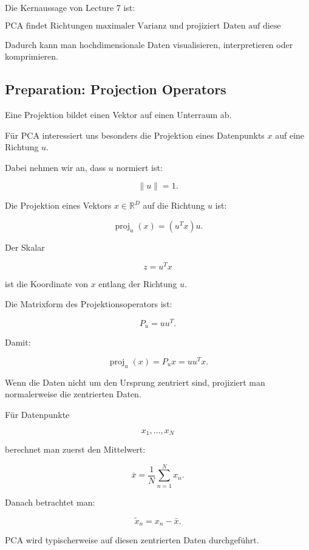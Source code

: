 \documentclass[11pt,a4paper]{scrartcl}
\begin{document}
\begin{answerbox}
    Die Kernaussage von Lecture 7 ist:

    \[
        \boxed{
            \text{PCA findet Richtungen maximaler Varianz und projiziert Daten auf diese Richtungen.}
        }
    \]

    Dadurch kann man hochdimensionale Daten visualisieren, interpretieren oder
    komprimieren.
\end{answerbox}

\subsection{Preparation: Projection Operators}

\begin{notebox}
    Eine Projektion bildet einen Vektor auf einen Unterraum ab.

    Für PCA interessiert uns besonders die Projektion eines Datenpunkts \(x\)
    auf eine Richtung \(u\).

    Dabei nehmen wir an, dass \(u\) normiert ist:

    \[
        \|u\| = 1.
    \]
\end{notebox}

\begin{calculationbox}
    Die Projektion eines Vektors \(x \in \mathbb{R}^D\) auf die Richtung \(u\)
    ist:

    \[
        \operatorname{proj}_u(x)
        =
        (u^T x)u.
    \]

    Der Skalar

    \[
        z = u^T x
    \]

    ist die Koordinate von \(x\) entlang der Richtung \(u\).

    Die Matrixform des Projektionsoperators ist:

    \[
        P_u
        =
        uu^T.
    \]

    Damit:

    \[
        \operatorname{proj}_u(x)
        =
        P_u x
        =
        uu^T x.
    \]
\end{calculationbox}

\begin{solutionbox}
    Wenn die Daten nicht um den Ursprung zentriert sind, projiziert man
    normalerweise die zentrierten Daten.

    Für Datenpunkte

    \[
        x_1,\dots,x_N
    \]

    berechnet man zuerst den Mittelwert:

    \[
        \bar x
        =
        \frac{1}{N}
        \sum_{n=1}^{N} x_n.
    \]

    Danach betrachtet man:

    \[
        \tilde x_n
        =
        x_n - \bar x.
    \]

    PCA wird typischerweise auf diesen zentrierten Daten durchgeführt.
\end{solutionbox}
\end{document}
